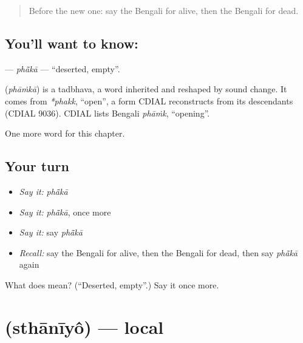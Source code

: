 \label{lesson:BN-C219-phaka}



\begin{quote}
Before the new one: say the Bengali for alive, then the Bengali for dead.
\end{quote}

\subsection*{You'll want to know: }
\textbf{} — \emph{phā̃kā} — \textquotedblleft{}deserted, empty\textquotedblright{}.

\begin{cousinweb}
\textbf{} (\emph{phāṁkā}) is a tadbhava, a word inherited and reshaped by sound change. It comes from \emph{*phakk}, \textquotedblleft{}open\textquotedblright{}, a form CDIAL reconstructs from its descendants (CDIAL 9036). CDIAL lists Bengali \emph{phāṁk}, \textquotedblleft{}opening\textquotedblright{}.
\end{cousinweb}

\begin{grammarlens}[title={What you've built}]
One more word for this chapter.
\end{grammarlens}

\subsection*{Your turn}
\begin{itemize}
\raggedright
  \item \emph{Say it:} \emph{phā̃kā}
  \item \emph{Say it:} \emph{phā̃kā}, once more
  \item \emph{Say it:} say \emph{phā̃kā}
  \item \emph{Recall:} say the Bengali for alive, then the Bengali for dead, then say \emph{phā̃kā} again
\end{itemize}

\begin{tcolorbox}[breakable,colback=teal!4,colframe=teal!35!black,title={Before you move on}]
What does  mean? (\textquotedblleft{}Deserted, empty\textquotedblright{}.) Say it once more.
\end{tcolorbox}
\section[\texorpdfstring{\bn{স্থানীয়} (sthānīyô)}{স্থানীয় (sthānīyô)}]{ (sthānīyô) — local}

